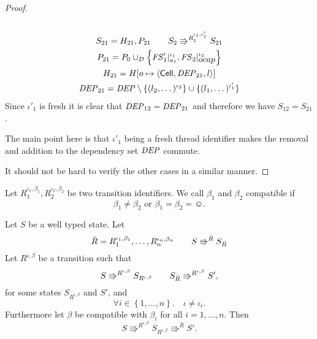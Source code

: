 \begin{proof}
\begin{description}
\begin{equation}
\begin{gathered}
        \end{gathered}
      \end{equation}
      \begin{equation} 
        \begin{gathered}
          S_{21} = H_{21}, P_{21} \quad\quad S_2 \Rrightarrow^{R_1^{\iota_1,
          \iota'_1}} S_{21}
          \\
          P_{21} = P_0 \cup_D \left\{ \mathit{FS}'_1|_{a_1}^{\iota_1},
          \mathit{FS}_2|_{\mbox{$ocap$}}^{\iota_2} \right\} \\
          H_{21} = H[o \mapsto \mbox{$\langle \mbox{$\mathsf{Cell}$}{}, \mathit{DEP}_{21}, l \rangle$}] \\ 
          \mathit{DEP}_{21} = \mathit{DEP} \setminus \{ (l_2, \dots)^{\iota_2} \} \cup \{ (l_1,
          \dots)^{\iota'_1} \} 
        \end{gathered}
      \end{equation}
      Since $\iota'_1$ is fresh it is clear that $\mathit{DEP}_{12} = \mathit{DEP}_{21}$ and
      therefore we have $S_{12} = S_{21}$.
      \begin{remark}
        The main point here is that $\iota'_1$ being a fresh thread identifier
        makes the removal and addition to the dependency set $\mathit{DEP}$ commute.
      \end{remark}
  \end{description}
  It should not be hard to verify the other cases in a similar manner.
\end{proof}

\begin{definition}
  Let $R_1^{\iota_1, \beta_1}, R_2^{\iota_2, \beta_2}$ be two transition
  identifiers. We call $\beta_1$ and $\beta_2$ compatible if
  \begin{equation*}
    \beta_1 \neq \beta_2 \text{ or } \beta_1 = \beta_2 = \smiley.
  \end{equation*}
\end{definition}

\begin{lemma} \label{lem:lemma2}
  Let $S$ be a well typed state. Let
  \begin{equation*}
    \bar{R} = R_1^{\iota_1, \beta_1}, \dots, R_n^{\iota_n, \beta_n} \quad\quad
    S \Rrightarrow^{\bar{R}} S_{\bar{R}}
  \end{equation*}
  Let $R^{\iota, \beta}$ be a transition such that 
  \begin{equation*}
    S \Rrightarrow^{R^{\iota, \beta}} S_{R^{\iota, \beta}} \quad\quad
    S_{\bar{R}} \Rrightarrow^{R^{\iota, \beta}} S',
  \end{equation*}
  for some states $S_{R^{\iota, \beta}}$ and $S'$, and
  \begin{equation} \label{eq:lemma2_1}
    \forall i \in \left\{ 1, \dots, n \right\}. \quad \iota \neq \iota_i  .
  \end{equation}
  Furthermore let $\beta$ be compatible with $\beta_i$ for all $i = 1, \dots,
  n$.
  Then
  \begin{equation*}
    S \Rrightarrow^{R^{\iota, \beta}} S_{R^{\iota, \beta}} \Rrightarrow^{\bar{R}} S'.
  \end{equation*}
\end{lemma}

